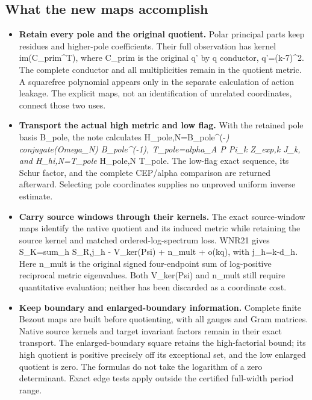 \documentclass[
]{article}
\providecommand{\tightlist}{%
  \setlength{\itemsep}{0pt}\setlength{\parskip}{0pt}}
\begin{document}
\subsection{What the new maps
accomplish}\label{what-the-new-maps-accomplish}

\begin{itemize}
\tightlist
\item
  \textbf{Retain every pole and the original quotient.} Polar principal
  parts keep residues and higher-pole coefficients. Their full
  observation has kernel im(C\_prim\^{}T), where C\_prim is the original
  q' by q conductor, q'=(k-7)\^{}2. The complete conductor and all
  multiplicities remain in the quotient metric. A squarefree polynomial
  appears only in the separate calculation of action leakage. The
  explicit maps, not an identification of unrelated coordinates, connect
  those two uses.
\item
  \textbf{Transport the actual high metric and low flag.} With the
  retained pole basis B\_pole, the note calculates
  H\_pole,N=B\_pole\^{}(-\emph{) conjugate(Omega\_N) B\_pole\^{}(-1),
  T\_pole=alpha\_A P Pi\_k Z\_exp,k J\_k, and H\_hi,N=T\_pole} H\_pole,N
  T\_pole. The low-flag exact sequence, its Schur factor, and the
  complete CEP/alpha comparison are returned afterward. Selecting pole
  coordinates supplies no unproved uniform inverse estimate.
\item
  \textbf{Carry source windows through their kernels.} The exact
  source-window maps identify the native quotient and its induced metric
  while retaining the source kernel and matched ordered-log-spectrum
  loss. WNR21 gives S\_K=sum\_h S\_R,j\_h - V\_ker(Psi) + n\_mult +
  o(kq), with j\_h=k-d\_h. Here n\_mult is the original signed
  four-endpoint sum of log-positive reciprocal metric eigenvalues. Both
  V\_ker(Psi) and n\_mult still require quantitative evaluation; neither
  has been discarded as a coordinate cost.
\item
  \textbf{Keep boundary and enlarged-boundary information.} Complete
  finite Bezout maps are built before quotienting, with all gauges and
  Gram matrices. Native source kernels and target invariant factors
  remain in their exact transport. The enlarged-boundary square retains
  the high-factorial bound; its high quotient is positive precisely off
  its exceptional set, and the low enlarged quotient is zero. The
  formulas do not take the logarithm of a zero determinant. Exact edge
  tests apply outside the certified full-width period range.
\end{itemize}
\end{document}
